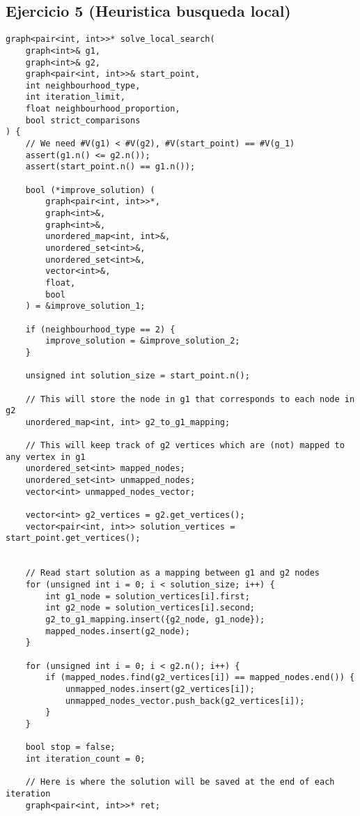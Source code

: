\subsection{Ejercicio 5 (Heuristica busqueda local)}
\begin{lstlisting}
graph<pair<int, int>>* solve_local_search(
    graph<int>& g1,
    graph<int>& g2,
    graph<pair<int, int>>& start_point,
    int neighbourhood_type,
    int iteration_limit,
    float neighbourhood_proportion,
    bool strict_comparisons
) {
    // We need #V(g1) < #V(g2), #V(start_point) == #V(g_1)
    assert(g1.n() <= g2.n());
    assert(start_point.n() == g1.n());

    bool (*improve_solution) (
        graph<pair<int, int>>*,
        graph<int>&,
        graph<int>&,
        unordered_map<int, int>&,
        unordered_set<int>&,
        unordered_set<int>&,
        vector<int>&,
        float,
        bool
    ) = &improve_solution_1;

    if (neighbourhood_type == 2) {
        improve_solution = &improve_solution_2;
    }

    unsigned int solution_size = start_point.n();

    // This will store the node in g1 that corresponds to each node in g2
    unordered_map<int, int> g2_to_g1_mapping;

    // This will keep track of g2 vertices which are (not) mapped to any vertex in g1
    unordered_set<int> mapped_nodes;
    unordered_set<int> unmapped_nodes;
    vector<int> unmapped_nodes_vector;

    vector<int> g2_vertices = g2.get_vertices();
    vector<pair<int, int>> solution_vertices = start_point.get_vertices();


    // Read start solution as a mapping between g1 and g2 nodes
    for (unsigned int i = 0; i < solution_size; i++) {
        int g1_node = solution_vertices[i].first;
        int g2_node = solution_vertices[i].second;
        g2_to_g1_mapping.insert({g2_node, g1_node});
        mapped_nodes.insert(g2_node);
    }

    for (unsigned int i = 0; i < g2.n(); i++) {
        if (mapped_nodes.find(g2_vertices[i]) == mapped_nodes.end()) {
            unmapped_nodes.insert(g2_vertices[i]);
            unmapped_nodes_vector.push_back(g2_vertices[i]);
        }
    }

    bool stop = false;
    int iteration_count = 0;

    // Here is where the solution will be saved at the end of each iteration
    graph<pair<int, int>>* ret;


\end{lstlisting}
